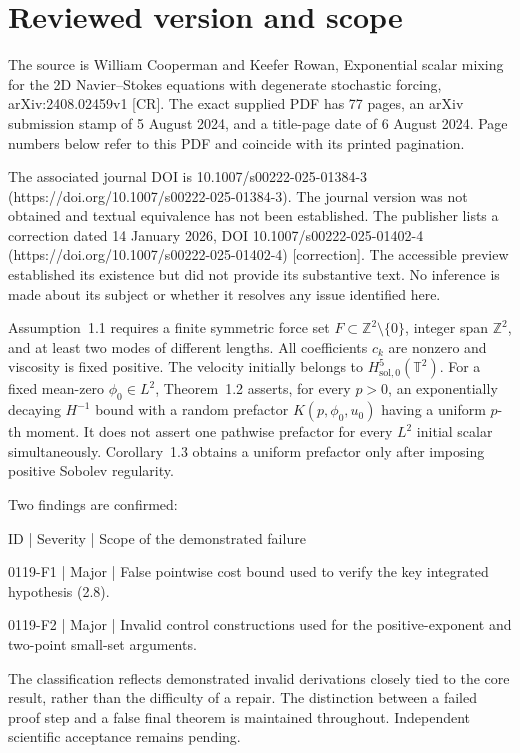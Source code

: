 \documentclass[10pt]{article}
\begin{document}
\section*{Reviewed version and scope}
The source is William Cooperman and Keefer Rowan, Exponential scalar mixing for the 2D Navier–Stokes equations with degenerate stochastic forcing, arXiv:2408.02459v1 [CR]. The exact supplied PDF has 77 pages, an arXiv submission stamp of 5 August 2024, and a title-page date of 6 August 2024. Page numbers below refer to this PDF and coincide with its printed pagination.\par
The associated journal DOI is 10.1007/s00222-025-01384-3 (https://doi.org/10.1007/s00222-025-01384-3). The journal version was not obtained and textual equivalence has not been established. The publisher lists a correction dated 14 January 2026, DOI 10.1007/s00222-025-01402-4 (https://doi.org/10.1007/s00222-025-01402-4) [correction]. The accessible preview established its existence but did not provide its substantive text. No inference is made about its subject or whether it resolves any issue identified here.\par
Assumption 1.1 requires a finite symmetric force set \(F\subset\mathbb Z^2\setminus\{0\}\), integer span \(\mathbb Z^2\), and at least two modes of different lengths. All coefficients \(c_k\) are nonzero and viscosity is fixed positive. The velocity initially belongs to \(H^5_{\mathrm{sol},0}(\mathbb T^2)\). For a fixed mean-zero \(\phi_0\in L^2\), Theorem 1.2 asserts, for every \(p>0\), an exponentially decaying \(H^{-1}\) bound with a random prefactor \(K(p,\phi_0,u_0)\) having a uniform \(p\)-th moment. It does not assert one pathwise prefactor for every \(L^2\) initial scalar simultaneously. Corollary 1.3 obtains a uniform prefactor only after imposing positive Sobolev regularity.\par
Two findings are confirmed:\par
ID | Severity | Scope of the demonstrated failure\par
0119-F1 | Major | False pointwise cost bound used to verify the key integrated hypothesis (2.8).\par
0119-F2 | Major | Invalid control constructions used for the positive-exponent and two-point small-set arguments.\par
The classification reflects demonstrated invalid derivations closely tied to the core result, rather than the difficulty of a repair. The distinction between a failed proof step and a false final theorem is maintained throughout. Independent scientific acceptance remains pending.\par
\end{document}
